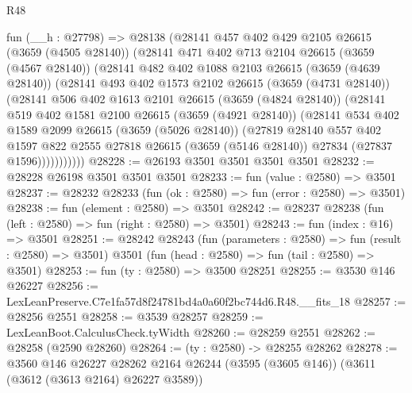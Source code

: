 \begin{lexlean}{R48}
\begin{coremodule}
      fun (__h : @27798) =>
      @28138
        (@28141
          @457
          @402
          @429
          @2105
          @26615
          (@3659 (@4505 @28140))
          (@28141
            @471
            @402
            @713
            @2104
            @26615
            (@3659 (@4567 @28140))
            (@28141
              @482
              @402
              @1088
              @2103
              @26615
              (@3659 (@4639 @28140))
              (@28141
                @493
                @402
                @1573
                @2102
                @26615
                (@3659 (@4731 @28140))
                (@28141
                  @506
                  @402
                  @1613
                  @2101
                  @26615
                  (@3659 (@4824 @28140))
                  (@28141
                    @519
                    @402
                    @1581
                    @2100
                    @26615
                    (@3659 (@4921 @28140))
                    (@28141
                      @534
                      @402
                      @1589
                      @2099
                      @26615
                      (@3659 (@5026 @28140))
                      (@27819
                        @28140
                        @557
                        @402
                        @1597
                        @822
                        @2555
                        @27818
                        @26615
                        (@3659 (@5146 @28140))
                        @27834
                        (@27837 @1596)))))))))))
@28228 := @26193 @3501 @3501 @3501 @3501
@28232 := @28228 @26198 @3501 @3501 @3501
@28233 := fun (value : @2580) => @3501
@28237 := @28232 @28233 (fun (ok : @2580) => fun (error : @2580) => @3501)
@28238 := fun (element : @2580) => @3501
@28242 := @28237 @28238 (fun (left : @2580) => fun (right : @2580) => @3501)
@28243 := fun (index : @16) => @3501
@28251 := @28242
    @28243
    (fun (parameters : @2580) => fun (result : @2580) => @3501)
    @3501
    (fun (head : @2580) => fun (tail : @2580) => @3501)
@28253 := fun (ty : @2580) => @3500 @28251
@28255 := @3530 @146 @26227
@28256 := LexLeanPreserve.C7e1fa57d8f24781bd4a0a60f2bc744d6.R48.__fits_18
@28257 := @28256 @2551
@28258 := @3539 @28257
@28259 := LexLeanBoot.CalculusCheck.tyWidth
@28260 := @28259 @2551
@28262 := @28258 (@2590 @28260)
@28264 := (ty : @2580) -> @28255 @28262
@28278 := @3560
    @146
    @26227
    @28262
    @2164
    @26244
    (@3595 (@3605 @146))
    (@3611 (@3612 (@3613 @2164) @26227 @3589))

\end{coremodule}
\end{lexlean}
